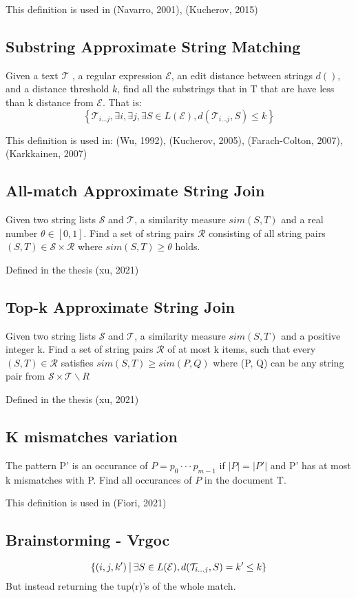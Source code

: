 \documentclass{article}
\newcommand{\set}[1]{\left\{#1\right\}}
\newcommand{\st}{\ \vline \ }
\begin{document}
This definition is used in (Navarro, 2001), (Kucherov, 2015)

\subsection{Substring Approximate String Matching}

Given a text $\mathcal{T}$ , a regular expression $\mathcal{E}$,
an edit distance between strings $d()$, and a distance threshold
$k$, find all the substrings that in T that are have less than k
distance from $\mathcal{E}$. That is:
\begin{equation*}
    \set{\mathcal{T}_{i...j}, \exists i, \exists j, \exists S \in L(\mathcal{E}), d(\mathcal{T}_{i...j} , S) \leq k}
\end{equation*}

This definition is used in: (Wu, 1992), (Kucherov, 2005), (Farach-Colton, 2007), (Karkkainen, 2007)

\subsection{All-match Approximate String Join}
Given two string lists $\mathcal{S}$ and $\mathcal{T}$, a similarity measure $sim(S, T)$ and a real number $\theta \in [0,1]$. Find a set of string pairs $\mathcal{R}$ consisting of all string pairs $(S, T) \in \mathcal{S} \times \mathcal{R}$ where $sim(S,T) \geq \theta$ holds.

Defined in the thesis (xu, 2021)

\subsection{Top-k Approximate String Join}

Given two string lists $\mathcal{S}$ and $\mathcal{T}$, a similarity measure $sim(S, T)$ and a positive integer k. Find a set of string pairs $\mathcal{R}$ of at most k items, such that every $(S,T) \in \mathcal{R}$ satisfies $sim(S,T) \geq sim(P, Q)$ where (P, Q) can be any string pair from $\mathcal{S} \times \mathcal{T} \backslash R$

Defined in the thesis (xu, 2021)

\subsection{K mismatches variation}
The pattern P' is an occurance of $P = p_0 \cdot \cdot\cdot p_{m-1}$ if $|P| = |P'|$ and P' has at most k mismatches with P. Find all occurances of $P$ in the document T.

This definition is used in (Fiori, 2021)

\subsection{Brainstorming - Vrgoc}
\begin{equation*}
    \set{(i, j, k') \st \exists S \in L(\mathcal{E}), d(\mathcal{T}_{i...j},S) = k' \leq k}
\end{equation*}
But instead returning the tup(r)'s of the whole match.
\end{document}
